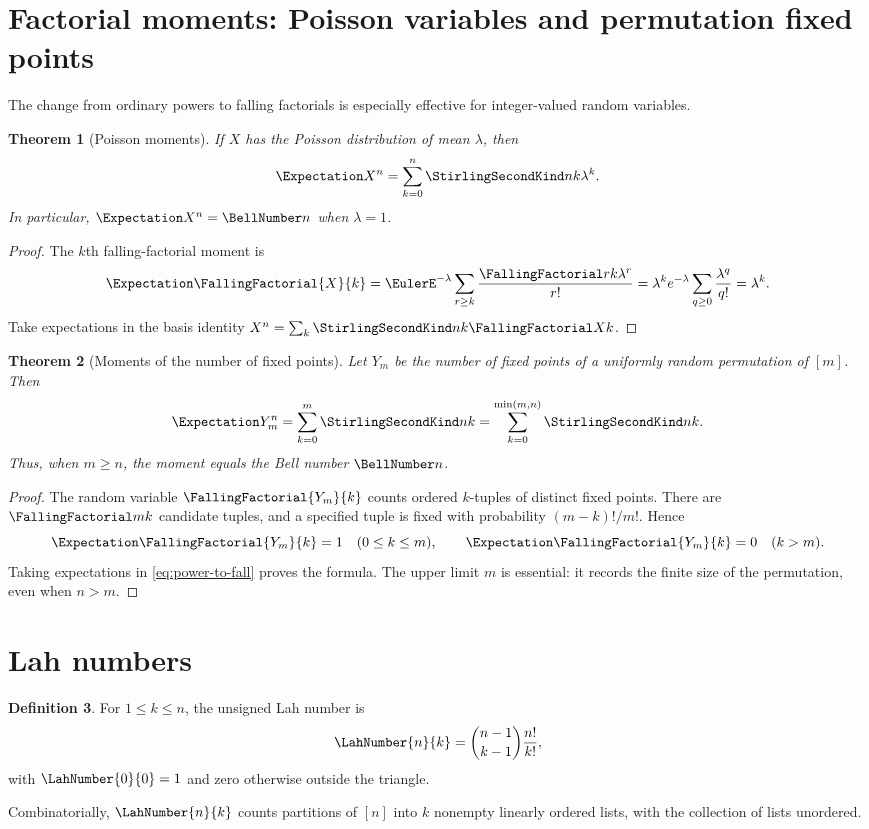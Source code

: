 \documentclass[11pt,a4paper,oneside,openany]{book}
\newtheorem{theorem}{Theorem}[chapter]
\theoremstyle{definition}
\newtheorem{definition}[theorem]{Definition}
\theoremstyle{remark}
\begin{document}
\section{Factorial moments: Poisson variables and permutation fixed points}
The change from ordinary powers to falling factorials is especially effective for
integer-valued random variables.

\begin{theorem}[Poisson moments]
\label{thm:poisson-stirling-moments}
If $X$ has the Poisson distribution of mean $\lambda$, then
\begin{equation}
\label{eq:poisson-stirling-moments}
 \Expectation X^n=\sum_{k=0}^{n}\StirlingSecondKind nk\lambda^k.
\end{equation}
In particular, $\Expectation X^n=\BellNumber n$ when $\lambda=1$.
\end{theorem}
\begin{proof}
The $k$th falling-factorial moment is
\[
 \Expectation\FallingFactorial{X}{k}
 =\EulerE^{-\lambda}\sum_{r\ge k}\frac{\FallingFactorial r k\lambda^r}{r!}
 =\lambda^ke^{-\lambda}\sum_{q\ge0}\frac{\lambda^q}{q!}
 =\lambda^k.
\]
Take expectations in the basis identity
$X^n=\sum_k\StirlingSecondKind nk\FallingFactorial Xk$.
\end{proof}

\begin{theorem}[Moments of the number of fixed points]
\label{thm:fixed-point-stirling-moments}
Let $Y_m$ be the number of fixed points of a uniformly random permutation of
$[m]$.  Then
\begin{equation}
\label{eq:fixed-point-stirling-moments}
 \Expectation Y_m^n=\sum_{k=0}^{m}\StirlingSecondKind nk
 =\sum_{k=0}^{\min(m,n)}\StirlingSecondKind nk.
\end{equation}
Thus, when $m\ge n$, the moment equals the Bell number $\BellNumber n$.
\end{theorem}
\begin{proof}
The random variable $\FallingFactorial{Y_m}{k}$ counts ordered $k$-tuples of distinct fixed
points.  There are $\FallingFactorial m k$ candidate tuples, and a specified tuple is fixed
with probability $(m-k)!/m!$.  Hence
\[
 \Expectation\FallingFactorial{Y_m}{k}=1\quad(0\le k\le m),
 \qquad
 \Expectation\FallingFactorial{Y_m}{k}=0\quad(k>m).
\]
Taking expectations in \eqref{eq:power-to-fall} proves the formula.  The upper
limit $m$ is essential: it records the finite size of the permutation, even when
$n>m$.
\end{proof}
\section{Lah numbers}
\begin{definition}
For $1\le k\le n$, the unsigned Lah number is
\begin{equation}\label{eq:lah-def}
 \LahNumber{n}{k}=\binom{n-1}{k-1}\frac{n!}{k!},
\end{equation}
with $\LahNumber{0}{0}=1$ and zero otherwise outside the triangle.
\end{definition}
Combinatorially, $\LahNumber{n}{k}$ counts partitions of $[n]$ into $k$ nonempty linearly
ordered lists, with the collection of lists unordered.
\end{document}
